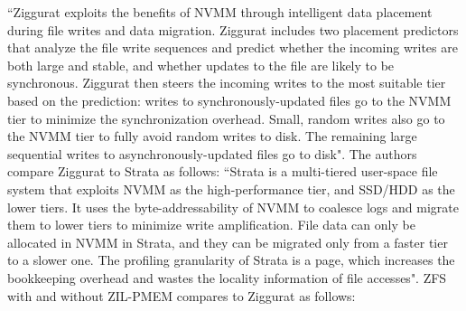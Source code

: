 \documentclass[12pt,a4paper,twoside]{book}
\begin{document}
``Ziggurat exploits the benefits of NVMM through intelligent data placement during file writes and data migration.
Ziggurat includes two placement predictors that analyze the file write sequences and predict whether the incoming writes are both large and stable, and whether updates to the file are likely to be synchronous.
Ziggurat then steers the incoming writes to the most suitable tier based on the prediction: writes to synchronously-updated files go to the NVMM tier to minimize the synchronization overhead.
Small, random writes also go to the NVMM tier to fully avoid random writes to disk. The remaining large sequential writes to asynchronously-updated files go to disk".
The authors compare Ziggurat to Strata as follows:
``Strata is a multi-tiered user-space file system that exploits NVMM as the high-performance tier, and SSD/HDD as the lower tiers.
It uses the byte-addressability of NVMM to coalesce logs and migrate them to lower tiers to minimize write amplification.
File data can only be allocated in NVMM in Strata, and they can be migrated only from a faster tier to a slower one.
The profiling granularity of Strata is a page, which increases the bookkeeping overhead and wastes the locality information of file accesses".
ZFS with and without ZIL-PMEM compares to Ziggurat as follows:
\end{document}

